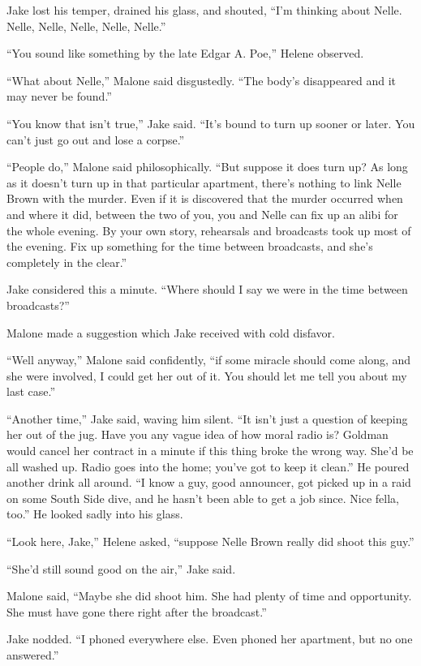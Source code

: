 \documentclass{novel}
\begin{document}
Jake lost his temper, drained his glass, and shouted, “I’m thinking about Nelle. Nelle, Nelle, Nelle, Nelle, Nelle.”

“You sound like something by the late Edgar A. Poe,” Helene observed.

“What about Nelle,” Malone said disgustedly. “The body’s disappeared and it may never be found.”

“You know that isn’t true,” Jake said. “It’s bound to turn up sooner or later. You can’t just go out and lose a corpse.”

“People do,” Malone said philosophically. “But suppose it does turn up? As long as it doesn’t turn up in that particular apartment, there’s nothing to link Nelle Brown with the murder. Even if it is discovered that the murder occurred when and where it did, between the two of you, you and Nelle can fix up an alibi for the whole evening. By your own story, rehearsals and broadcasts took up most of the evening. Fix up something for the time between broadcasts, and she’s completely in the clear.”

Jake considered this a minute. “Where should I say we were in the time between broadcasts?”

Malone made a suggestion which Jake received with cold disfavor.

“Well anyway,” Malone said confidently, “if some miracle should come along, and she were involved, I could get her out of it. You should let me tell you about my last case.”

“Another time,” Jake said, waving him silent. “It isn’t just a question of keeping her out of the jug. Have you any vague idea of how moral radio is? Goldman would cancel her contract in a minute if this thing broke the wrong way. She’d be all washed up. Radio goes into the home; you’ve got to keep it clean.” He poured another drink all around. “I know a guy, good announcer, got picked up in a raid on some South Side dive, and he hasn’t been able to get a job since. Nice fella, too.” He looked sadly into his glass.

“Look here, Jake,” Helene asked, “suppose Nelle Brown really did shoot this guy.”

“She’d still sound good on the air,” Jake said.

Malone said, “Maybe she did shoot him. She had plenty of time and opportunity. She must have gone there right after the broadcast.”

Jake nodded. “I phoned everywhere else. Even phoned her apartment, but no one answered.”
\end{document}
